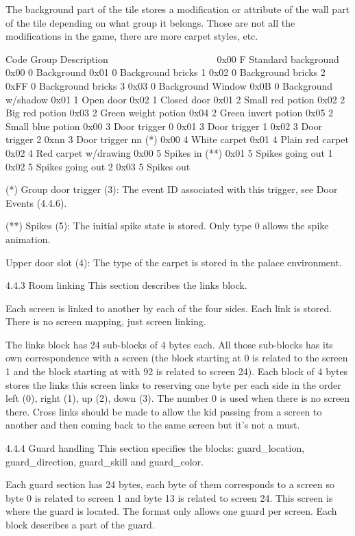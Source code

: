  The background part of the tile stores a modification or attribute of the
 wall part of the tile depending on what group it belongs. Those are not
 all the modifications in the game, there are more carpet styles, etc.

  Code Group Description
  ~~~~ ~~~~~ ~~~~~~~~~~~
  0x00 F     Standard background
  0x00 0     Background
  0x01 0     Background bricks 1
  0x02 0     Background bricks 2
  0xFF 0     Background bricks 3
  0x03 0     Background Window
  0x0B 0     Background w/shadow
  0x01 1     Open door
  0x02 1     Closed door
  0x01 2     Small red potion
  0x02 2     Big red potion
  0x03 2     Green weight potion
  0x04 2     Green invert potion
  0x05 2     Small blue potion
  0x00 3     Door trigger 0
  0x01 3     Door trigger 1
  0x02 3     Door trigger 2
  0xnn 3     Door trigger nn (*)
  0x00 4     White carpet
  0x01 4     Plain red carpet
  0x02 4     Red carpet w/drawing
  0x00 5     Spikes in (**)
  0x01 5     Spikes going out 1
  0x02 5     Spikes going out 2 
  0x03 5     Spikes out

 (*) Group door trigger (3):
 The event ID associated with this trigger, see Door Events (4.4.6).

 (**) Spikes (5):
 The initial spike state is stored. Only type 0 allows the spike animation.

 Upper door slot (4):
 The type of the carpet is stored in the palace environment.

4.4.3 Room linking
 This section describes the links block.

 Each screen is linked to another by each of the four sides. Each link
 is stored. There is no screen mapping, just screen linking.

 The links block has 24 sub-blocks of 4 bytes each. All those sub-blocks
 has its own correspondence with a screen (the block starting at 0 is
 related to the screen 1 and the block starting at with 92 is related to
 screen 24).
 Each block of 4 bytes stores the links this screen links to reserving one
 byte per each side in the order left (0), right (1), up (2), down (3).
 The number 0 is used when there is no screen there.
 Cross links should be made to allow the kid passing from a screen to
 another and then coming back to the same screen but it's not a must.

4.4.4 Guard handling
 This section specifies the blocks: guard_location, guard_direction,
 guard_skill and guard_color.

 Each guard section has 24 bytes, each byte of them corresponds to a screen
 so byte 0 is related to screen 1 and byte 13 is related to screen 24.
 This screen is where the guard is located. The format only allows one
 guard per screen. Each block describes a part of the guard.

